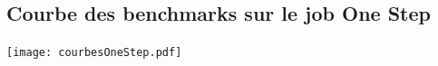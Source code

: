 \documentclass[a4paper, 11pt]{article}
\begin{document}
	\label{txtmesures}
	\begin{center}
	\subsection{Courbe des benchmarks sur le job One Step}	
	\vspace{2\baselineskip}
	\texttt{[image: courbesOneStep.pdf]}		
	\end{center}
\end{document}
